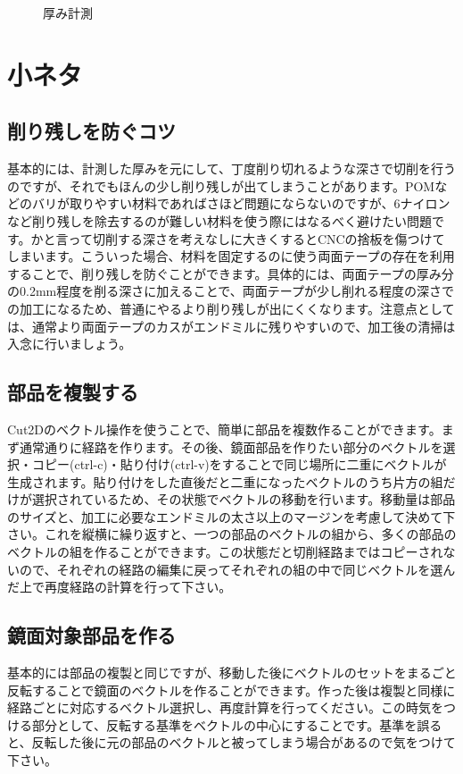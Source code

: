 \documentclass[b5paper, 9pt, twocolumn, titlepage,openany]{jsbook}%
\begin{document}
\begin{figure}[tbh]
\begin{center}
\begin{minipage}{0.7\columnwidth}
    \end{minipage}
    \caption{厚み計測\label{thickness}}
  \end{center}
\end{figure}


\clearpage
\section{小ネタ}
\subsection{削り残しを防ぐコツ}
基本的には、計測した厚みを元にして、丁度削り切れるような深さで切削を行うのですが、それでもほんの少し削り残しが出てしまうことがあります。POMなどのバリが取りやすい材料であればさほど問題にならないのですが、6ナイロンなど削り残しを除去するのが難しい材料を使う際にはなるべく避けたい問題です。かと言って切削する深さを考えなしに大きくするとCNCの捨板を傷つけてしまいます。こういった場合、材料を固定するのに使う両面テープの存在を利用することで、削り残しを防ぐことができます。具体的には、両面テープの厚み分の0.2mm程度を削る深さに加えることで、両面テープが少し削れる程度の深さでの加工になるため、普通にやるより削り残しが出にくくなります。注意点としては、通常より両面テープのカスがエンドミルに残りやすいので、加工後の清掃は入念に行いましょう。\\

\subsection{部品を複製する}
Cut2Dのベクトル操作を使うことで、簡単に部品を複数作ることができます。まず通常通りに経路を作ります。その後、鏡面部品を作りたい部分のベクトルを選択・コピー(ctrl-c)・貼り付け(ctrl-v)をすることで同じ場所に二重にベクトルが生成されます。貼り付けをした直後だと二重になったベクトルのうち片方の組だけが選択されているため、その状態でベクトルの移動を行います。移動量は部品のサイズと、加工に必要なエンドミルの太さ以上のマージンを考慮して決めて下さい。これを縦横に繰り返すと、一つの部品のベクトルの組から、多くの部品のベクトルの組を作ることができます。この状態だと切削経路まではコピーされないので、それぞれの経路の編集に戻ってそれぞれの組の中で同じベクトルを選んだ上で再度経路の計算を行って下さい。\\

\subsection{鏡面対象部品を作る}
基本的には部品の複製と同じですが、移動した後にベクトルのセットをまるごと反転することで鏡面のベクトルを作ることができます。作った後は複製と同様に経路ごとに対応するベクトル選択し、再度計算を行ってください。この時気をつける部分として、反転する基準をベクトルの中心にすることです。基準を誤ると、反転した後に元の部品のベクトルと被ってしまう場合があるので気をつけて下さい。\\
\end{document}
